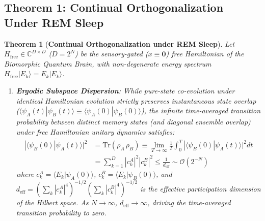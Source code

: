 \documentclass[10pt,twocolumn,3p]{article}
\newtheorem{theorem}{Theorem}
\begin{document}
\subsection{Theorem 1: Continual Orthogonalization Under REM Sleep}
\label{subsec:theorem1}

\begin{theorem}[\textbf{Continual Orthogonalization under REM Sleep}]
\label{thm:continual_orthogonalization}
Let $H_{\text{free}} \in \mathbb{C}^{D \times D}$ ($D = 2^N$) be the sensory-gated ($x \equiv \mathbf{0}$) free Hamiltonian of the Biomorphic Quantum Brain, with non-degenerate energy spectrum $H_{\text{free}} |E_k\rangle = E_k |E_k\rangle$.

\begin{enumerate}
    \item \textbf{Ergodic Subspace Dispersion}:
    While pure-state co-evolution under identical Hamiltonian evolution strictly preserves instantaneous state overlap ($\langle \psi_A(t) | \psi_B(t) \rangle \equiv \langle \psi_A(0) | \psi_B(0) \rangle$), the infinite time-averaged transition probability between distinct memory states (and diagonal ensemble overlap) under free Hamiltonian unitary dynamics satisfies:
    \begin{align}
        \overline{|\langle \psi_B(0) | \psi_A(t) \rangle|^2} &= \text{Tr}(\overline{\rho_A} \, \overline{\rho_B}) \equiv \lim_{T \to \infty} \frac{1}{T} \int_0^T |\langle \psi_B(0) | \psi_A(t) \rangle|^2 dt \nonumber \\
        &= \sum_{k=1}^D |c_k^A|^2 |c_k^B|^2 \le \frac{1}{d_{\text{eff}}} \sim \mathcal{O}(2^{-N})
        \label{eq:ergodic_bound}
    \end{align}
    where $c_k^A = \langle E_k | \psi_A(0)\rangle$, $c_k^B = \langle E_k | \psi_B(0)\rangle$, and $d_{\text{eff}} = \left(\sum_k |c_k^A|^4\right)^{-1/2} \left(\sum_k |c_k^B|^4\right)^{-1/2}$ is the effective participation dimension of the Hilbert space. As $N \to \infty$, $d_{\text{eff}} \to \infty$, driving the time-averaged transition probability to zero.
    

\end{enumerate}
\end{theorem}
\end{document}

